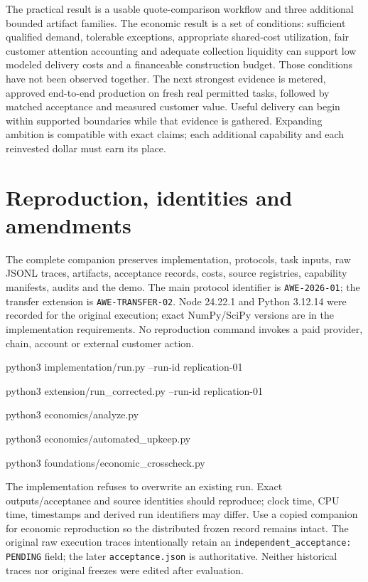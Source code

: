 The practical result is a usable quote-comparison workflow and three additional bounded artifact families. The economic result is a set of conditions: sufficient qualified demand, tolerable exceptions, appropriate shared-cost utilization, fair customer attention accounting and adequate collection liquidity can support low modeled delivery costs and a financeable construction budget. Those conditions have not been observed together. The next strongest evidence is metered, approved end-to-end production on fresh real permitted tasks, followed by matched acceptance and measured customer value. Useful delivery can begin within supported boundaries while that evidence is gathered. Expanding ambition is compatible with exact claims; each additional capability and each reinvested dollar must earn its place.

\appendix
\section{Reproduction, identities and amendments}\label{app:amendments}

The complete companion preserves implementation, protocols, task inputs, raw JSONL traces, artifacts, acceptance records, costs, source registries, capability manifests, audits and the demo. The main protocol identifier is \texttt{AWE-2026-01}; the transfer extension is \texttt{AWE-TRANSFER-02}. Node 24.22.1 and Python 3.12.14 were recorded for the original execution; exact NumPy/SciPy versions are in the implementation requirements. No reproduction command invokes a paid provider, chain, account or external customer action.

\begin{tcolorbox}[colback=gray!5,colframe=gray!35,title={Reproduce in a new run directory}]
\small\ttfamily
python3 implementation/run.py --run-id replication-01\par
python3 extension/run\_corrected.py --run-id replication-01\par
python3 economics/analyze.py\par
python3 economics/automated\_upkeep.py\par
python3 foundations/economic\_crosscheck.py
\end{tcolorbox}

The implementation refuses to overwrite an existing run. Exact outputs/acceptance and source identities should reproduce; clock time, CPU time, timestamps and derived run identifiers may differ. Use a copied companion for economic reproduction so the distributed frozen record remains intact. The original raw execution traces intentionally retain an \texttt{independent\_acceptance: PENDING} field; the later \texttt{acceptance.json} is authoritative. Neither historical traces nor original freezes were edited after evaluation.

